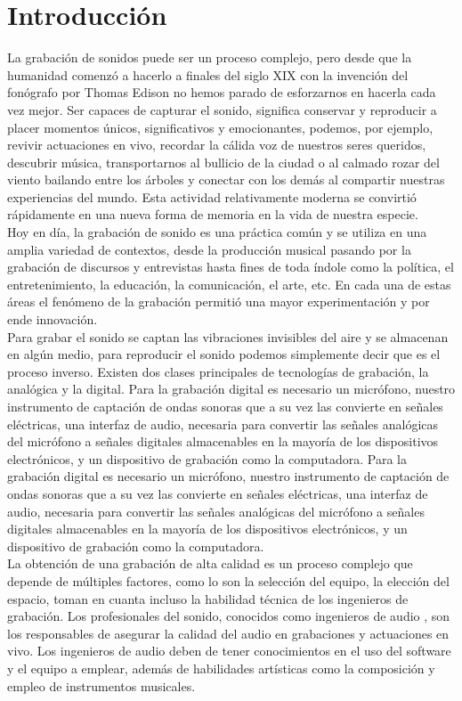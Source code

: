 \section*{Introducción}
La grabación de sonidos puede ser un proceso complejo, pero desde que la humanidad comenzó a hacerlo a finales del siglo XIX con la invención del fonógrafo por Thomas Edison \cite{Library2016} no hemos parado de esforzarnos en hacerla cada vez mejor. Ser capaces de capturar el sonido, significa conservar y reproducir a placer momentos únicos, significativos y emocionantes, podemos, por ejemplo, revivir actuaciones en vivo, recordar la cálida voz de nuestros seres queridos, descubrir música, transportarnos al bullicio de la ciudad o al calmado rozar del viento bailando entre los árboles y conectar con los demás al compartir nuestras experiencias del mundo. Esta actividad relativamente moderna se convirtió rápidamente en una nueva forma de memoria en la vida de nuestra especie.
\\
Hoy en día, la grabación de sonido es una práctica común y se utiliza en una amplia variedad de contextos, desde la producción musical pasando por la grabación de discursos y entrevistas hasta fines de toda índole como la política, el entretenimiento, la educación, la comunicación, el arte, etc. En cada una de estas áreas el fenómeno de la grabación permitió una mayor experimentación y por ende innovación. 
\\
Para grabar el sonido se captan las vibraciones invisibles del aire y se almacenan en algún medio, para reproducir el sonido podemos simplemente decir que es el proceso inverso. Existen dos clases principales de tecnologías de grabación, la analógica y la digital. Para la grabación digital es necesario un micrófono, nuestro instrumento de captación de ondas sonoras que a su vez las convierte en señales eléctricas, una interfaz de audio, necesaria para convertir las señales analógicas del micrófono a señales digitales almacenables en la mayoría de los dispositivos electrónicos, y un dispositivo de grabación como la computadora. Para la grabación digital es necesario un micrófono, nuestro instrumento de captación de ondas sonoras que a su vez las convierte en señales eléctricas, una interfaz de audio, necesaria para convertir las señales analógicas del micrófono a señales digitales almacenables en la mayoría de los dispositivos electrónicos, y un dispositivo de grabación como la computadora.
\\
La obtención de una grabación de alta calidad es un proceso complejo que depende de múltiples factores, como lo son la selección del equipo, la elección del espacio, toman en cuanta incluso la habilidad técnica de los ingenieros de grabación. Los profesionales del sonido, conocidos como ingenieros de audio \cite{Sheffieldav}, son los responsables de asegurar la calidad del audio en grabaciones y actuaciones en vivo. Los ingenieros de audio deben de tener conocimientos en el uso del software y el equipo a emplear, además de habilidades artísticas como la composición y empleo de instrumentos musicales.
